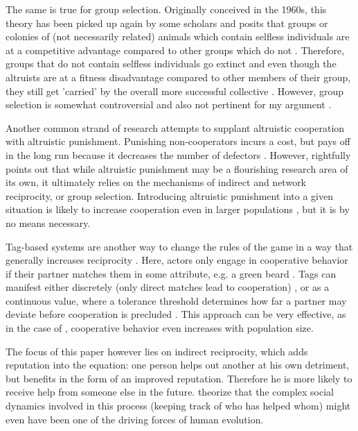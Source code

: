 \documentclass[12pt]{article}
\begin{document}
The same is true for group selection. Originally conceived in the 1960s, this theory has been picked up again by some scholars and posits that groups or colonies of (not necessarily related) animals which contain selfless individuals are at a competitive advantage compared to other groups which do not \citep{Heschl1994}. Therefore, groups that do not contain selfless individuals go extinct and even though the altruists are at a fitness disadvantage compared to other members of their group, they still get 'carried' by the overall more successful collective \citep{samir2009}. However, group selection is somewhat controversial and also not pertinent for my argument \citep{Abbot2013}.

Another common strand of research attempts to supplant altruistic cooperation with altruistic punishment. Punishing non-cooperators incurs a cost, but pays off in the long run because it decreases the number of defectors \citep{Fehr2002,boyd2003}. However, \cite{Nowak2006a} rightfully points out that while altruistic punishment may be a flourishing research area of its own, it ultimately relies on the mechanisms of indirect and network reciprocity, or group selection. Introducing altruistic punishment into a given situation is likely to increase cooperation even in larger populations \citep{Tang2016}, but it is by no means necessary.

Tag-based systems are another way to change the rules of the game in a way that generally increases reciprocity \citep{Hamilton1964,Axelrod2004,Spector2006, Cohen2012, Shutters2013}. Here, actors only engage in cooperative behavior if their partner matches them in some attribute, e.g. a green beard \citep{Dawkins1976}. Tags can manifest either discretely (only direct matches lead to cooperation) \citep{Axelrod2004}, or as a continuous value, where a tolerance threshold determines how far a partner may deviate before cooperation is precluded \citep{Shutters2013, Shutters2015}. This approach can be very effective, as in the case of \cite{Shutters2015}, cooperative behavior even increases with population size.


The focus of this paper however lies on indirect reciprocity, which adds reputation into the equation: one person helps out another at his own detriment, but benefits in the form of an improved reputation. Therefore he is more likely to receive help from someone else in the future. \cite{Nowak1998} theorize that the complex social dynamics involved in this process (keeping track of who has helped whom) might even have been one of the driving forces of human evolution.
\end{document}
